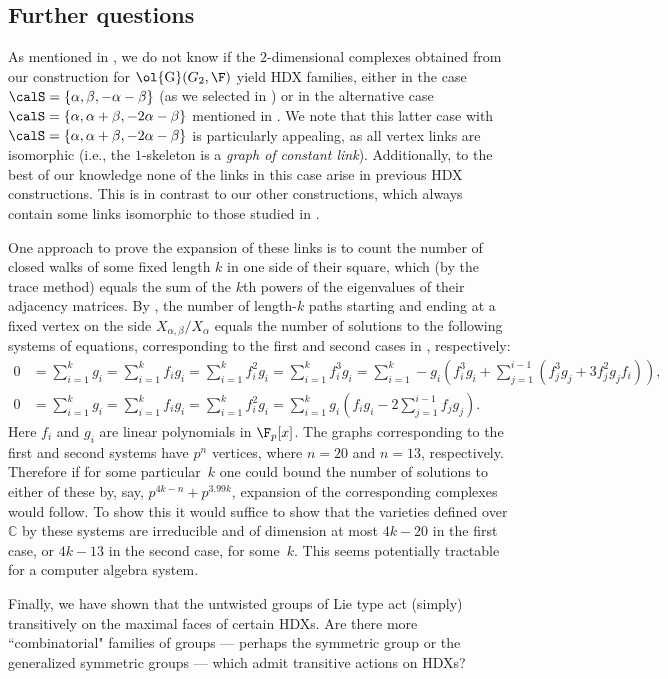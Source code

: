 \documentclass[11pt]{article}
\newcommand{\Esc}[2]{\ol{\mathrm{G}}(#1,#2)}
\begin{document}
\subsection{Further questions}  \label{sec:further}
As mentioned in , we do not know if the $2$-dimensional complexes obtained from our construction for $\Esc{G_2}{\F}$ yield HDX families, either in the case  $\calS = \{\alpha, \beta, -\alpha-\beta\}$ (as we selected in ) or in the alternative case $\calS = \{\alpha,\alpha+\beta,-2\alpha-\beta\}$ mentioned in . We note that this latter case with $\calS = \{\alpha,\alpha+\beta,-2\alpha-\beta\}$ is particularly appealing, as all vertex links are isomorphic (i.e., the $1$-skeleton is a \emph{graph of constant link}). Additionally, to the best of our knowledge none of the links in this case arise in previous HDX constructions. This is in contrast to our other constructions, which always contain some links isomorphic to those studied in \cite{KO18}.

One approach to prove the expansion of these links is to count the number of closed walks of some fixed length $k$ in one side of their square, which (by the trace method) equals the sum of the $k$th powers of the eigenvalues of their adjacency matrices. By , the number of length-$k$ paths starting and ending at a fixed vertex on the side $X_{\alpha,\beta}/X_\alpha$ equals the number of solutions to the following systems of equations, corresponding to the first and second cases in , respectively:
\begin{align*}
0 &= \sum_{i=1}^k g_i = \sum_{i=1}^k f_ig_i = \sum_{i=1}^k f_i^2g_i = \sum_{i=1}^k f_i^3g_i=\sum_{i=1}^k -g_i(f_i^3g_i+\sum_{j=1}^{i-1} (f_j^3g_j+3f_j^2g_jf_i)),\\
0 &=\sum_{i=1}^k g_i = \sum_{i=1}^k f_ig_i = \sum_{i=1}^k f_i^2g_i = \sum_{i=1}^k g_i(f_ig_i - 2\sum_{j=1}^{i-1} f_jg_j).
\end{align*}
Here $f_i$ and $g_i$ are linear polynomials in $\F_p[x]$. The graphs corresponding to the first and second systems have $p^n$ vertices, where $n=20$ and $n=13$, respectively. Therefore if for some particular~$k$ one could bound the number of solutions to either of these by, say, $p^{4k-n} + p^{3.99k}$, expansion of the corresponding complexes would follow. To show this it would suffice to show that the varieties defined over $\mathbb{C}$ by these systems are irreducible and of dimension at most $4k-20$ in the first case, or $4k-13$ in the second case, for some~$k$. This seems potentially tractable for a computer algebra system.

Finally, we have shown that the untwisted groups of Lie type act (simply) transitively on the maximal faces of certain HDXs. Are there more ``combinatorial" families of groups --- perhaps the symmetric group or the generalized symmetric groups --- which admit transitive actions on HDXs?
\nocite{Sch10}

\end{document}
